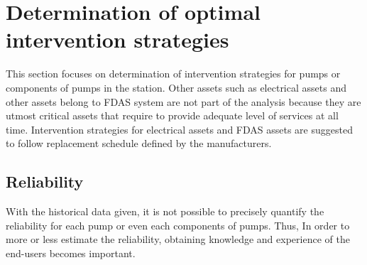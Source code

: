 \section{Determination of optimal intervention strategies}

This section focuses on determination of intervention strategies for pumps or components of pumps in the station. Other assets such as electrical assets and other assets belong to FDAS system are not part of the analysis because they are utmost critical assets that require to provide adequate level of services at all time. Intervention strategies for electrical assets and FDAS assets are suggested to follow replacement schedule defined by the manufacturers.
%
\subsection{Reliability}
With the historical data given, it is not possible to precisely quantify the reliability for each pump or even each components of pumps. Thus, In order to more or less estimate the reliability, obtaining knowledge and experience of the end-users becomes important.

